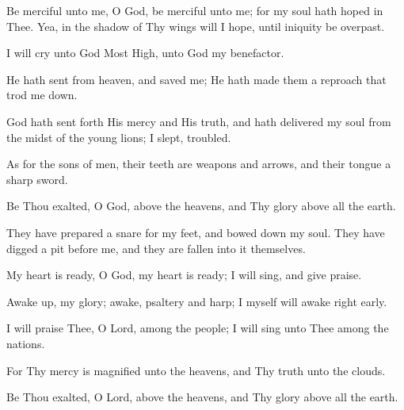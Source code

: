 Be merciful unto me, O God, be merciful unto me; for my soul hath hoped in Thee. Yea, in the shadow of Thy wings will I hope, until iniquity be overpast.

I will cry unto God Most High, unto God my benefactor.

He hath sent from heaven, and saved me; He hath made them a reproach that trod me down.

God hath sent forth His mercy and His truth, and hath delivered my soul from the midst of the young lions; I slept, troubled.

As for the sons of men, their teeth are weapons and arrows, and their tongue a sharp sword.

Be Thou exalted, O God, above the heavens, and Thy glory above all the earth.

They have prepared a snare for my feet, and bowed down my soul. They have digged a pit before me, and they are fallen into it themselves.

My heart is ready, O God, my heart is ready; I will sing, and give praise.

Awake up, my glory; awake, psaltery and harp; I myself will awake right early.

I will praise Thee, O Lord, among the people; I will sing unto Thee among the nations.

For Thy mercy is magnified unto the heavens, and Thy truth unto the clouds.

Be Thou exalted, O Lord, above the heavens, and Thy glory above all the earth.
